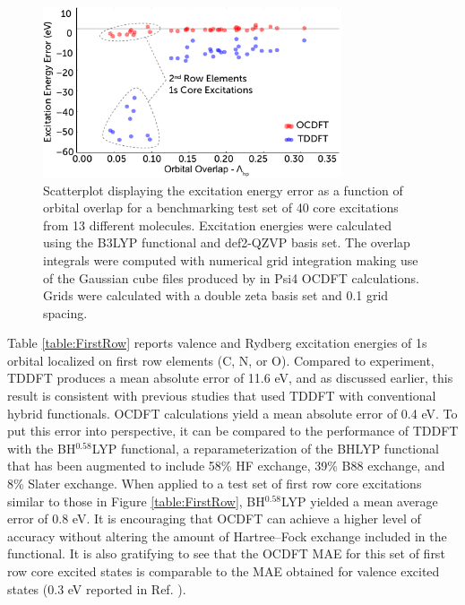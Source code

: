 \documentclass[8.5pt,twoside,twocolumn]{article}
\begin{document}
\begin{figure}[!b]
\centering
\includegraphics[width=8.8cm]{scatterNEWER2.pdf}
\caption{Scatterplot displaying the excitation energy error as a function of orbital overlap for a benchmarking test set of 40 core excitations from 13 different molecules. Excitation energies were calculated using the B3LYP functional and def2-QZVP basis set. The overlap integrals were computed with numerical grid integration making use of the Gaussian cube files produced by in Psi4 OCDFT calculations. Grids were calculated with a double zeta basis set and 0.1 grid spacing.}
\label{figure:scatter}
\end{figure}
Table \ref{table:FirstRow} reports valence and Rydberg excitation energies of 1s orbital localized on first row elements (C, N, or O). Compared to experiment, TDDFT produces a mean absolute error of 11.6 eV, and as discussed earlier, this result is consistent with previous studies that used TDDFT with conventional hybrid functionals.\cite{besley_self-consistent-field_2009} OCDFT calculations yield a mean absolute error of 0.4 eV. To put this error into perspective, it can be compared to the performance of TDDFT with the BH$^{0.58}$LYP functional,\cite{besley_time-dependent_2009} a reparameterization of the BHLYP functional\cite{becke_new_1993,lee_development_1988-1} that has been augmented to include 58\% HF exchange, 39\% B88 exchange, and 8\% Slater exchange. When applied to a test set of first row core excitations similar to those in Figure \ref{table:FirstRow}, BH$^{0.58}$LYP yielded a mean average error of 0.8 eV. It is encouraging that OCDFT can achieve a higher level of accuracy without altering the amount of Hartree--Fock exchange included in the functional. It is also gratifying to see that the OCDFT MAE for this set of first row core excited states is comparable to the MAE obtained for valence excited states (0.3 eV reported in Ref. ).
\end{document}
